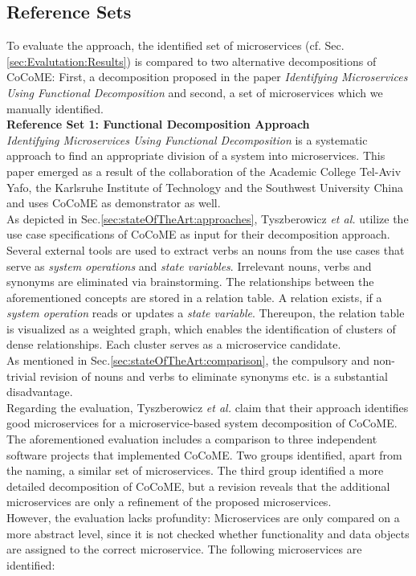 \subsection{Reference Sets}
\label{sec:Evaluation:ReferenceSets}
To evaluate the approach, the identified set of microservices (cf. Sec.\ref{sec:Evalutation:Results}) is compared to two alternative decompositions of CoCoME: First, a decomposition proposed in the paper \textit{Identifying Microservices Using Functional Decomposition} \cite{FunctionalDecompositionHeinrich} and second, a set of microservices which we manually identified. \\

\noindent
\textbf{Reference Set 1: Functional Decomposition Approach} \\
\textit{Identifying Microservices Using Functional Decomposition} \cite{FunctionalDecompositionHeinrich} is a systematic approach to find an appropriate division of a system into microservices. This paper emerged as a result of the collaboration of the Academic College Tel-Aviv Yafo, the Karlsruhe Institute of Technology and the Southwest University China and uses CoCoME as demonstrator as well.\\
As depicted in Sec.\ref{sec:stateOfTheArt:approaches}, Tyszberowicz \textit{et al.} utilize the use case specifications of CoCoME \cite{CoCoMEOld} as input for their decomposition approach. Several external tools are used to extract verbs an nouns from the use cases that serve as \textit{system operations} and \textit{state variables}. Irrelevant nouns, verbs and synonyms are eliminated via brainstorming. The relationships between the aforementioned concepts are stored in a relation table. A relation exists, if a \textit{system operation} reads or updates a \textit{state variable}. Thereupon, the relation table is visualized as a weighted graph, which enables the identification of clusters of dense relationships. Each cluster serves as a microservice candidate.\\
As mentioned in Sec.\ref{sec:stateOfTheArt:comparison}, the compulsory and non-trivial revision of nouns and verbs to eliminate synonyms etc. is a substantial disadvantage.\\
Regarding the evaluation, Tyszberowicz \textit{et al.} claim that their approach identifies good microservices for a microservice-based system decomposition of CoCoME. The aforementioned evaluation includes a comparison to three independent software projects that implemented CoCoME. Two groups identified, apart from the naming, a similar set of microservices. The third group identified a more detailed decomposition of CoCoME, but a revision reveals that the additional microservices are only a refinement of the proposed microservices. \\
However, the evaluation lacks profundity: Microservices are only compared on a more abstract level, since it is not checked whether functionality and data objects are assigned to the correct microservice. The following microservices are identified: 



